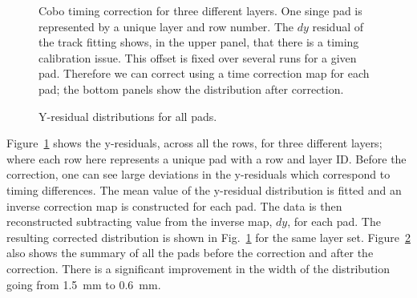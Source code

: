 \begin{figure}[!htb]%
    \centering
    \qquad
    
	\qquad

	\caption{Cobo timing correction for three different layers. One singe pad is represented by a unique layer and row number. The $dy$ residual of the track fitting shows, in the upper panel, that there is a timing calibration issue. This offset is fixed over several runs for a given pad. Therefore we can correct using a time correction map for each pad; the bottom panels show the distribution after correction. }
  	\label{fig:coboCorr}
\end{figure}



\begin{figure}[!htb]%
    \centering
    \qquad

    \caption{Y-residual distributions for all pads.}
	\label{fig:yoff}
\end{figure}


 Figure~\ref{fig:coboCorr} shows the y-residuals, across all the rows, for three different layers; where each row here represents a unique pad with a row and layer ID. Before the correction, one can see large deviations in the y-residuals which correspond to timing differences. The mean value of the y-residual distribution is fitted and an inverse correction map is constructed for each pad. The data is then reconstructed subtracting value from the inverse map, $dy$, for each pad. The resulting corrected distribution is shown in Fig.~\ref{fig:coboCorr} for the same layer set. Figure~\ref{fig:yoff} also shows the summary of all the pads before the correction and after the correction. There is a significant improvement in the width of the distribution going from \SI{1.5}{\milli\metre} to \SI{0.6}{\milli\metre}. 



